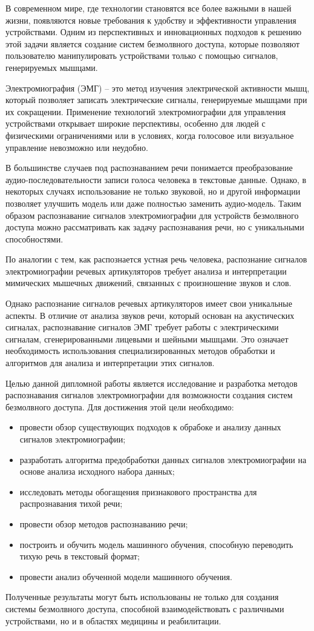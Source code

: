 

В современном мире, где технологии становятся все более важными в нашей жизни, появляются новые требования к удобству и эффективности управления устройствами. Одним из перспективных и инновационных подходов к решению этой задачи является создание систем безмолвного доступа, которые позволяют пользователю манипулировать устройствами только с помощью сигналов, генерируемых мышцами.

Электромиография (ЭМГ) – это метод изучения электрической активности мышц, который позволяет записать электрические сигналы, генерируемые мышцами при их сокращении. Применение технологий электромиографии для управления устройствами открывает широкие перспективы, особенно для людей с физическими ограничениями или в условиях, когда голосовое или визуальное управление невозможно или неудобно.

В большинстве случаев под распознаванием речи понимается преобразование аудио-последовательности записи голоса человека в текстовые данные. Однако, в некоторых случаях использование не только звуковой, но и другой информации позволяет улучшить модель или даже полностью заменить аудио-модель. Таким образом распознавание сигналов электромиографии для устройств безмолвного доступа можно рассматривать как задачу распознавания речи, но с уникальными способностями.

По аналогии с тем, как распознается устная речь человека, распознание сигналов электромиографии речевых артикуляторов требует анализа и интерпретации мимических мышечных движений, связанных с произношение звуков и слов. 

Однако распознание сигналов речевых артикуляторов имеет свои уникальные аспекты. В отличие от анализа звуков речи, который основан на акустических сигналах, распознавание сигналов ЭМГ требует работы с электрическими сигналам, сгенерированными лицевыми и шейными мышцами. Это означает необходимость использования специализированных методов обработки и алгоритмов для анализа и интерпретации этих сигналов. 

Целью данной дипломной работы является исследование и разработка методов распознавания сигналов электромиографии для возможности создания систем безмолвного доступа. Для достижения этой цели необходимо: 

\vspace{0.5em-\topsep}
\begin{itemize}
    \item провести обзор существующих подходов к обрабоке и анализу данных сигналов электромиографии;
    \item разработать алгоритма предобработки данных сигналов электромиографии на основе анализа исходного набора данных;
    \item исследовать методы обогащения признакового пространства для распрознавания тихой речи;
    \item провести обзор методов распознаванию речи;
    \item построить и обучить модель машинного обучения, способную переводить тихую речь в текстовый формат;
    \item провести анализ обученной модели машинного обучения.
\end{itemize}

Полученные результаты могут быть использованы не только для создания системы безмолвного доступа, способной взаимодействовать с различными устройствами, но и в областях медицины и реабилитации.

